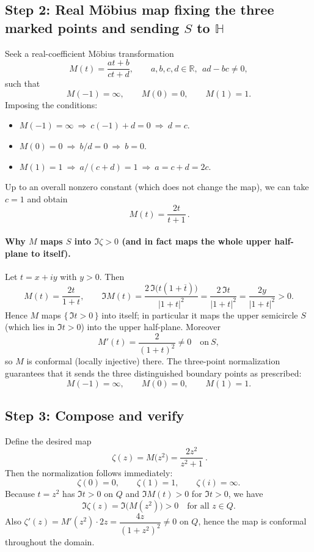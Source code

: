 \documentclass[11pt]{article}
\begin{document}
	\subsection*{Step 2: Real Möbius map fixing the three marked points and sending $S$ to $\mathbb H$}
	Seek a real-coefficient Möbius transformation
	\[
	M(t)=\frac{a t+b}{c t+d},\qquad a,b,c,d\in\mathbb R,\ \ ad-bc\neq0,
	\]
	such that
	\[
	M(-1)=\infty,\qquad M(0)=0,\qquad M(1)=1.
	\]
	Imposing the conditions:
	
	\begin{itemize}
		\item $M(-1)=\infty \ \Rightarrow\ c(-1)+d=0 \ \Rightarrow\ d=c$.
		\item $M(0)=0 \ \Rightarrow\ b/d=0 \ \Rightarrow\ b=0$.
		\item $M(1)=1 \ \Rightarrow\ a/(c+d)=1 \ \Rightarrow\ a=c+d=2c$.
	\end{itemize}
	
	Up to an overall nonzero constant (which does not change the map), we can take $c=1$ and obtain
	\[
	\boxed{\,M(t)=\frac{2t}{t+1}\,}.
	\]
	
	\paragraph{Why $M$ maps $S$ into $\Im\zeta>0$ (and in fact maps the whole upper half-plane to itself).}
	Let $t=x+iy$ with $y>0$. Then
	\[
	M(t)=\frac{2t}{1+t},\qquad
	\Im M(t)=\frac{2\,\Im\big(t(1+\overline{t})\big)}{|1+t|^{2}}
	=\frac{2\,\Im t}{|1+t|^{2}}
	=\frac{2y}{|1+t|^{2}}
	>0.
	\]
	Hence $M$ maps $\{\,\Im t>0\,\}$ into itself; in particular it maps the upper semicircle $S$
	(which lies in $\Im t>0$) into the upper half-plane. Moreover
	\[
	M'(t)=\frac{2}{(1+t)^{2}}\neq0\quad\text{on}\ S,
	\]
	so $M$ is conformal (locally injective) there. The three-point normalization guarantees that it
	sends the three distinguished boundary points as prescribed:
	\[
	M(-1)=\infty,\qquad M(0)=0,\qquad M(1)=1.
	\]
	
	\subsection*{Step 3: Compose and verify}
	Define the desired map
	\[
	\boxed{\ \zeta(z)=M\big(z^{2}\big)=\frac{2z^{2}}{z^{2}+1}\ }.
	\]
	Then the normalization follows immediately:
	\[
	\zeta(0)=0,\qquad \zeta(1)=1,\qquad \zeta(i)=\infty .
	\]
	Because $t=z^{2}$ has $\Im t>0$ on $Q$ and $\Im M(t)>0$ for $\Im t>0$, we have
	\[
	\Im \zeta(z)=\Im\big(M(z^{2})\big)>0\quad\text{for all }z\in Q.
	\]
	Also $\zeta'(z)=M'(z^{2})\cdot 2z=\dfrac{4z}{(1+z^{2})^{2}}\neq0$ on $Q$, hence the map is conformal
	throughout the domain.
	
\end{document}
